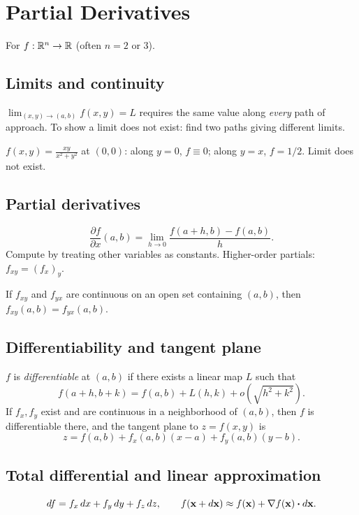 \section{Partial Derivatives}

For $f : \mathbb{R}^n \to \mathbb{R}$ (often $n = 2$ or $3$).

\subsection{Limits and continuity}
$\displaystyle \lim_{(x,y)\to(a,b)} f(x,y) = L$ requires the same value along \emph{every}
path of approach. To show a limit does not exist: find two paths giving different limits.

\begin{example}
$f(x,y) = \tfrac{xy}{x^2+y^2}$ at $(0,0)$: along $y = 0$, $f \equiv 0$; along $y = x$, $f = 1/2$.
Limit does not exist.
\end{example}

\subsection{Partial derivatives}
\[
\frac{\partial f}{\partial x}(a, b) = \lim_{h \to 0} \frac{f(a + h, b) - f(a, b)}{h}.
\]
Compute by treating other variables as constants. Higher-order partials: $f_{xy} = (f_x)_y$.

\begin{theorem}[Clairaut]
If $f_{xy}$ and $f_{yx}$ are continuous on an open set containing $(a,b)$, then
$f_{xy}(a,b) = f_{yx}(a,b)$.
\end{theorem}

\subsection{Differentiability and tangent plane}
$f$ is \emph{differentiable} at $(a,b)$ if there exists a linear map $L$ such that
\[ f(a + h, b + k) = f(a,b) + L(h,k) + o(\sqrt{h^2 + k^2}). \]
If $f_x, f_y$ exist and are continuous in a neighborhood of $(a,b)$, then $f$ is differentiable there,
and the tangent plane to $z = f(x,y)$ is
\[ z = f(a,b) + f_x(a,b) (x - a) + f_y(a,b) (y - b). \]

\subsection{Total differential and linear approximation}
\[ df = f_x \,dx + f_y \,dy + f_z \,dz, \qquad f(\mathbf{x} + d\mathbf{x}) \approx f(\mathbf{x}) + \nabla f(\mathbf{x}) \boldsymbol\cdot d\mathbf{x}. \]

